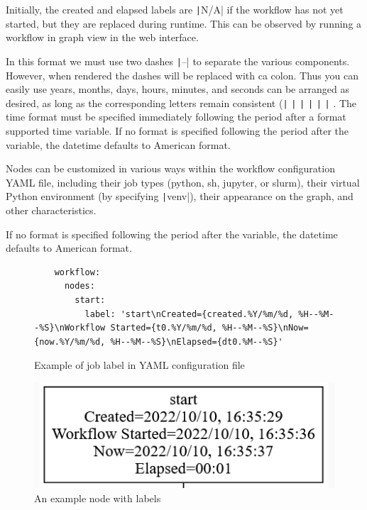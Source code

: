 Initially, the created and elapsed labels are \texttt|N/A| if the
workflow has not yet started, but they are replaced during runtime. This
can be observed by running a workflow in graph view in the web
interface.

In this format we must use two dashes \texttt|--| to separate the various components. However, when rendered the dashes will be replaced with ca colon. Thus you can easily use years, months, days,
hours, minutes, and seconds can be arranged as desired, as long as the
corresponding letters remain consistent 
(\texttt|%
\texttt|%
\texttt|%
\texttt|%
\texttt|%
\texttt|%
. The time format must be specified immediately following the period after a format supported time variable. If no format is specified following the period after the variable, the
datetime defaults to American format.


Nodes can be customized in various ways within the workflow
configuration YAML file, including their job types (python, sh, jupyter,
or slurm), their virtual Python environment (by specifying
\texttt|venv|), their appearance on the graph, and other
characteristics.

If no format is specified following the period after the variable, the
datetime defaults to American format.


\begin{figure}
\smallskip
    \begin{verbatim}
    workflow:
      nodes:
        start:
          label: 'start\nCreated={created.%Y/%m/%d, %H--%M--%S}\nWorkflow Started={t0.%Y/%m/%d, %H--%M--%S}\nNow={now.%Y/%m/%d, %H--%M--%S}\nElapsed={dt0.%M--%S}'
    \end{verbatim}
    \caption{Example of job label in YAML configuration file}
    \label{fig:label-job}

\centering
\includegraphics[width=0.7\columnwidth]{images/labelmaker-example.png}
\caption{An example node with labels}\label{fig:label-node}
\end{figure}

